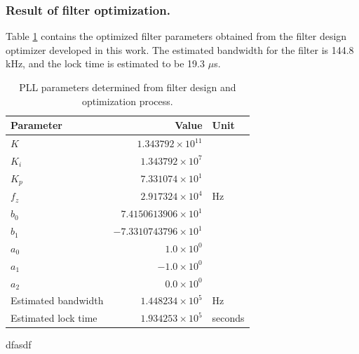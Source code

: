 \subsubsection{Result of filter optimization.}
Table \ref{filter_params} contains the optimized filter parameters obtained from the filter design optimizer developed in this work. The estimated bandwidth for the filter is 144.8 kHz, and the lock time is estimated to be 19.3 $\mu$s.
\begin{table}[h!]
	\centering
	\def\arraystretch{1.5}		
	\setlength\arrayrulewidth{0.75pt}
	\setlength{\tabcolsep}{1em} %
	\begin{tabular}{|l|r|l|}
		\hline 
		\rule[-1ex]{0pt}{2.5ex} \cellcolor{gray!40}\textbf{Parameter} & \cellcolor{gray!40}\textbf{Value} & \cellcolor{gray!40}\textbf{Unit }\\ 
		\hline 
		\rule[-1ex]{0pt}{2.5ex} \textbf{$K$}  & $1.343792\times10^{11}$ &  \\ 
		\hline 
		\rule[-1ex]{0pt}{2.5ex} \textbf{$K_i$}  & $1.343792\times10^{7}$ &  \\ 
		\hline 
		\rule[-1ex]{0pt}{2.5ex} \textbf{$K_p$}  & $7.331074\times10^{1}$ &  \\ 
		\hline 
		\rule[-1ex]{0pt}{2.5ex} \textbf{$f_z$} & $2.917324\times10^4$ & Hz\\ 
		\hline 
		\rule[-1ex]{0pt}{2.5ex} \textbf{$b_0$} & $7.4150613906\times10^1$  &\\ 
		\hline 
		\rule[-1ex]{0pt}{2.5ex} \textbf{$b_1$} & $-7.3310743796\times10^1$  & \\ 
		\hline 
		\rule[-1ex]{0pt}{2.5ex} \textbf{$a_0$} & $1.0\times10^0$  &\\ 
		\hline 
		\rule[-1ex]{0pt}{2.5ex} \textbf{$a_1$} & $-1.0\times10^0$  & \\ 
		\hline 
		\rule[-1ex]{0pt}{2.5ex} \textbf{$a_2$} & $0.0\times10^0$  & \\ 
		\hline 
		\rule[-1ex]{0pt}{2.5ex} Estimated bandwidth & $1.448234\times10^5$ & Hz \\ 
		\hline 
		\rule[-1ex]{0pt}{2.5ex} Estimated lock time & $1.934253\times10^5$ & seconds \\ 
		\hline 
	\end{tabular} 
	\caption{PLL parameters determined from filter design and optimization process.}
	\label{filter_params}
\end{table}   
dfasdf

